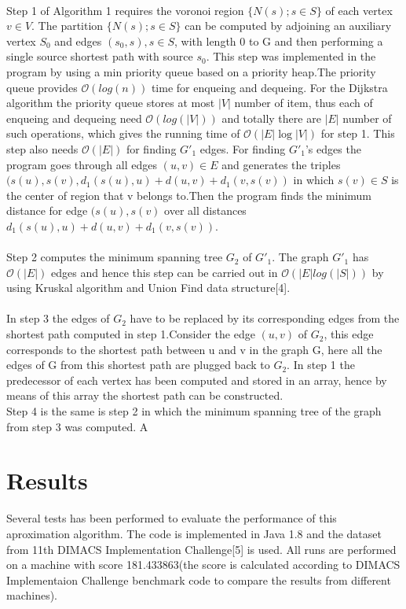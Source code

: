 \documentclass[a4paper,10pt]{article}
\begin{document}
\paragraph{}
Step 1 of Algorithm 1 requires the voronoi region $\{ N(s); s\in S \}$ of each vertex $v\in V$. The partition $\{ N(s); s\in S \}$ can be computed by adjoining an auxiliary vertex $ S_0 $ and edges $ (s_0,s ),s \in S $, with length 0 to G and then performing a single source shortest path with source $s_0$. This step was implemented in the program by using a min priority queue based on a priority heap.The priority queue provides $ \mathcal{O}(log(n)) $ time for enqueing and dequeing. For the Dijkstra algorithm the priority queue stores at most $|V|$ number of item, thus each of enqueing and dequeing need $ \mathcal{O}(log(|V|)) $ and totally there are $|E|$ number of such operations, which gives the running time of $ \mathcal{O}(\left| E \right|\log{} |V|)$ for step 1. This step also needs $\mathcal{O}(|E|)$ for finding $G'_1$ edges. For finding $G'_1$'s edges the program goes through all edges $(u,v)\in E$ and generates the triples $(s(u),s(v),d_1(s(u),u)+d(u,v)+d_1(v,s(v))$ in which $s(v)\in S$ is the center of region that v belongs to.Then the program finds the minimum distance for edge $(s(u),s(v)$ over all distances $d_1(s(u),u)+d(u,v)+d_1(v,s(v))$.   
\paragraph{}
Step 2 computes the minimum spanning tree $G_2$ of $G'_1$. The graph $G'_1$ has $\mathcal{O} (|E|)$ edges and hence this step can be carried out in $\mathcal{O}(|E|log(|S|))$ by using Kruskal algorithm and Union Find data structure[4].
\paragraph{}
In step 3 the edges of $G_2$ have to be replaced by its corresponding edges from the shortest path computed in step 1.Consider the edge $(u,v)$ of $G_2$, this edge corresponds to the shortest path between u and v in the graph G, here all the edges of G from this shortest path are plugged back to $G_2$. In step 1 the predecessor of each vertex has been computed and stored in an array, hence by means of this array the shortest path can be constructed.\\
Step 4 is the same is step 2 in which the minimum spanning tree of the graph from step 3 was computed. A


\section{Results}
Several tests has been performed to evaluate the performance of this aproximation algorithm. The code is implemented in Java 1.8 and the dataset from 11th DIMACS Implementation Challenge[5] is used. All runs are performed on a machine with score 181.433863(the score is calculated according to DIMACS Implementaion Challenge benchmark code to compare the results from different machines).  
\end{document}
